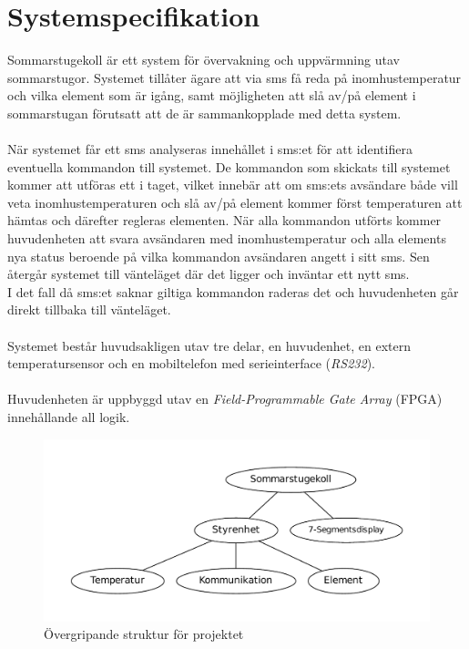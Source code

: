 \documentclass[a4paper]{scrartcl}
\begin{document}
\section{Systemspecifikation} 
	Sommarstugekoll är ett system för övervakning och uppvärmning utav
	sommarstugor. Systemet  tillåter ägare att via sms få reda på inomhustemperatur och vilka
	element som är igång, samt möjligheten att slå av/på element i sommarstugan förutsatt att de
	är sammankopplade med detta system.
	\\\\
	När systemet får ett sms analyseras innehållet i sms:et för att identifiera eventuella kommandon
	till systemet. De kommandon som skickats till systemet kommer att utföras ett i taget, vilket
	innebär att om sms:ets avsändare både vill veta inomhustemperaturen och slå av/på element
	kommer först temperaturen att hämtas och därefter regleras elementen.  När alla kommandon
	utförts kommer huvudenheten att svara avsändaren med inomhustemperatur och alla elements
	nya status beroende på vilka kommandon avsändaren angett i sitt sms. Sen återgår systemet till
	vänteläget där det ligger och inväntar ett nytt sms.\\
	I det fall då sms:et saknar giltiga kommandon raderas det och huvudenheten går direkt tillbaka till
	vänteläget. 
	\\\\
	Systemet består huvudsakligen  utav tre delar, en huvudenhet,  en extern temperatursensor och en
	mobiltelefon med serieinterface (\emph{RS232}).  
	\\\\
	Huvudenheten är uppbyggd utav en \emph{Field-Programmable Gate Array} (FPGA) innehållande
	all logik.
\begin{figure}[H]
	\centering
	\includegraphics[width=\textwidth]{bigpicture.pdf}
	\caption{Övergripande struktur för projektet}
\end{figure}
\end{document}
